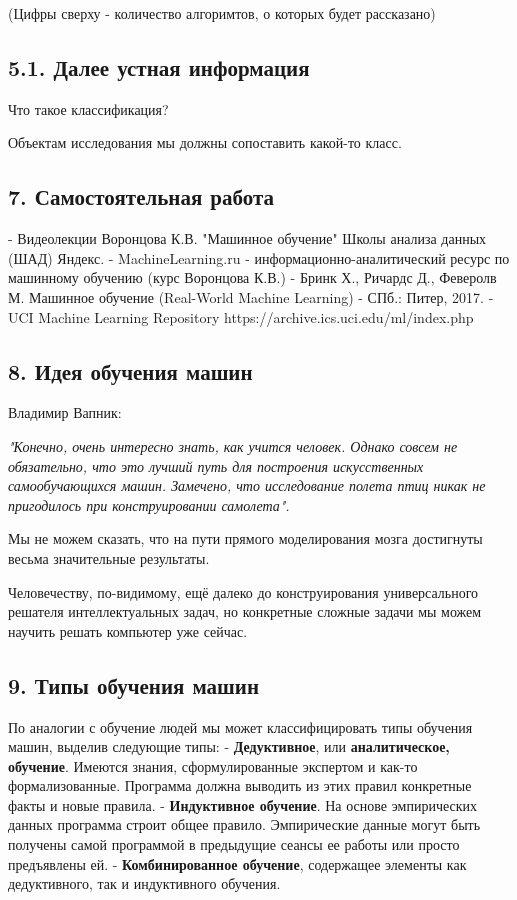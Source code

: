 (Цифры сверху - количество алгоримтов, о которых будет рассказано)

\subsection{5.1. Далее устная информация}

Что такое классификация?

Объектам исследования мы должны сопоставить какой-то класс.


\subsection{7. Самостоятельная работа}

- Видеолекции Воронцова К.В. "Машинное обучение"
Школы анализа данных (ШАД) Яндекс.
- MachineLearning.ru - информационно-аналитический ресурс по машинному
обучению (курс Воронцова К.В.)
- Бринк Х., Ричардс Д., Феверолв М. Машинное обучение
(Real-World Machine Learning) - СПб.: Питер, 2017.
- UCI Machine Learning Repository
https://archive.ics.uci.edu/ml/index.php

\subsection{8. Идея обучения машин}

Владимир Вапник:

\textit{"Конечно, очень интересно знать, как учится человек. Однако совсем не
обязательно, что это лучший путь для построения искусственных
самообучающихся машин.
Замечено, что исследование полета птиц никак не пригодилось при
конструировании самолета".}

Мы не можем сказать, что на пути прямого моделирования мозга достигнуты
весьма значительные результаты.

Человечеству, по-видимому, ещё далеко до конструирования
универсального решателя интеллектуальных задач,
но конкретные сложные задачи мы можем научить решать компьютер уже сейчас.

\subsection{9. Типы обучения машин}

По аналогии с обучение людей мы может классифицировать типы обучения машин,
выделив следующие типы:
- \textbf{Дедуктивное}, или \textbf{аналитическое, обучение}. Имеются знания,
сформулированные экспертом и как-то формализованные.
Программа должна выводить из этих правил конкретные факты и новые правила.
- \textbf{Индуктивное обучение}. На основе эмпирических данных программа строит
общее правило. Эмпирические данные могут быть получены самой программой в
предыдущие сеансы ее работы или просто предъявлены ей.
- \textbf{Комбинированное обучение}, содержащее элементы как дедуктивного, так и
индуктивного обучения.

